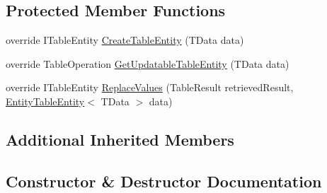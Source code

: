 \subsection*{Protected Member Functions}
\begin{DoxyCompactItemize}
\item 
override I\+Table\+Entity \hyperlink{classCqrs_1_1Azure_1_1Storage_1_1DataStores_1_1TableStorageDataStore_abf8e295af6e0925f1c9c3550b931a4a8}{Create\+Table\+Entity} (T\+Data data)
\item 
override Table\+Operation \hyperlink{classCqrs_1_1Azure_1_1Storage_1_1DataStores_1_1TableStorageDataStore_a54f00f53521e285568f19c29527d6466}{Get\+Updatable\+Table\+Entity} (T\+Data data)
\item 
override I\+Table\+Entity \hyperlink{classCqrs_1_1Azure_1_1Storage_1_1DataStores_1_1TableStorageDataStore_ae9aeb3daf2648a03db25f2a3ddfd87ee}{Replace\+Values} (Table\+Result retrieved\+Result, \hyperlink{classCqrs_1_1Azure_1_1BlobStorage_1_1EntityTableEntity}{Entity\+Table\+Entity}$<$ T\+Data $>$ data)
\end{DoxyCompactItemize}
\subsection*{Additional Inherited Members}


\subsection{Constructor \& Destructor Documentation}
\mbox{\label{classCqrs_1_1Azure_1_1Storage_1_1DataStores_1_1TableStorageDataStore_a25a32a83c14eb5068f5bc9bcacfa15f6}} 
